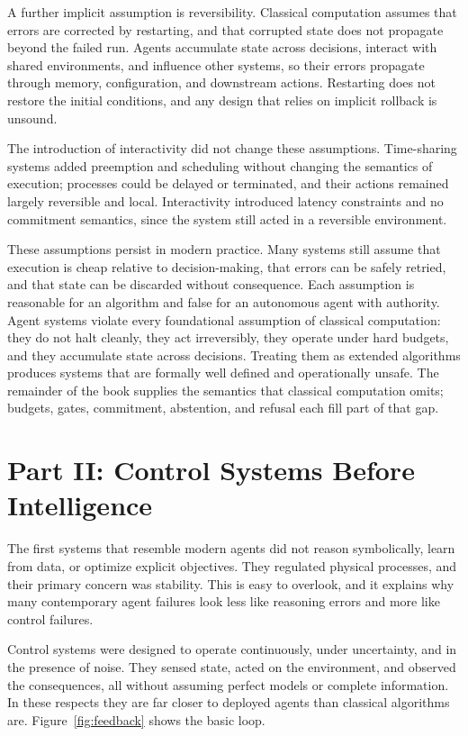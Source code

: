 \documentclass[11pt]{book}
\begin{document}
A further implicit assumption is reversibility. Classical computation assumes that errors are corrected by restarting, and that corrupted state does not propagate beyond the failed run. Agents accumulate state across decisions, interact with shared environments, and influence other systems, so their errors propagate through memory, configuration, and downstream actions. Restarting does not restore the initial conditions, and any design that relies on implicit rollback is unsound.

The introduction of interactivity did not change these assumptions. Time-sharing systems added preemption and scheduling \cite{corbato1962experimental} without changing the semantics of execution; processes could be delayed or terminated, and their actions remained largely reversible and local. Interactivity introduced latency constraints and no commitment semantics, since the system still acted in a reversible environment.

These assumptions persist in modern practice. Many systems still assume that execution is cheap relative to decision-making, that errors can be safely retried, and that state can be discarded without consequence. Each assumption is reasonable for an algorithm and false for an autonomous agent with authority. Agent systems violate every foundational assumption of classical computation: they do not halt cleanly, they act irreversibly, they operate under hard budgets, and they accumulate state across decisions. Treating them as extended algorithms produces systems that are formally well defined and operationally unsafe. The remainder of the book supplies the semantics that classical computation omits; budgets, gates, commitment, abstention, and refusal each fill part of that gap.

\section{Part II: Control Systems Before Intelligence}

The first systems that resemble modern agents did not reason symbolically, learn from data, or optimize explicit objectives. They regulated physical processes, and their primary concern was stability. This is easy to overlook, and it explains why many contemporary agent failures look less like reasoning errors and more like control failures.

Control systems were designed to operate continuously, under uncertainty, and in the presence of noise. They sensed state, acted on the environment, and observed the consequences, all without assuming perfect models or complete information. In these respects they are far closer to deployed agents than classical algorithms are. Figure~\ref{fig:feedback} shows the basic loop.
\end{document}
